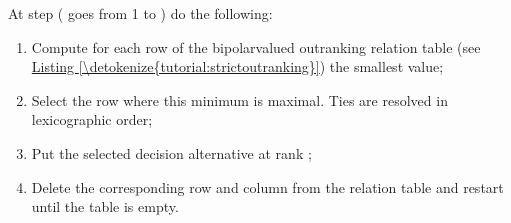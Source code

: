 \documentclass[a4paper,12pt,english]{sphinxhowto}
\begin{document}
At step  ( goes from 1 to ) do the following:
\begin{enumerate}
%
\item {} 
Compute for each row of the bipolar\sphinxhyphen{}valued  outranking relation table (see \hyperref[\detokenize{tutorial:strictoutranking}]{Listing \ref{\detokenize{tutorial:strictoutranking}}}) the smallest value;

\item {} 
Select the row where this minimum is maximal. Ties are resolved in lexicographic order;

\item {} 
Put the selected decision alternative at rank ;

\item {} 
Delete the corresponding row and column from the relation table and restart until the table is empty.

\end{enumerate}
\def\sphinxLiteralBlockLabel{\label{\detokenize{tutorial:kohlerranking}}}
\begin{sphinxVerbatim}[commandchars=\\\{\},numbers=left,firstnumber=1,stepnumber=1]
   
  
  
\end{sphinxVerbatim}
\end{document}

